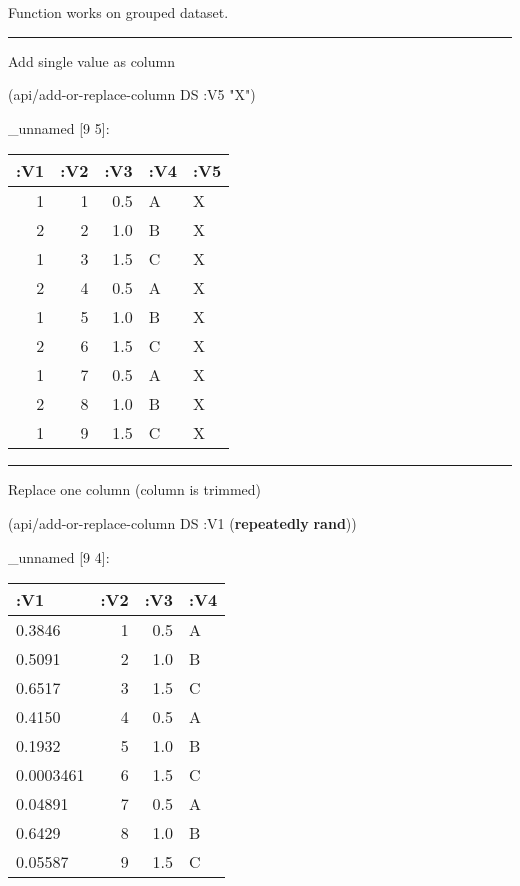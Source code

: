 \documentclass[]{article}
\newenvironment{Shaded}{\begin{snugshade}}{\end{snugshade}}
\newcommand{\KeywordTok}[1]{\textcolor[rgb]{0.13,0.29,0.53}{\textbf{#1}}}
\newcommand{\StringTok}[1]{\textcolor[rgb]{0.31,0.60,0.02}{#1}}
\newcommand{\AttributeTok}[1]{\textcolor[rgb]{0.77,0.63,0.00}{#1}}
\newcommand{\NormalTok}[1]{#1}
\begin{document}
Function works on grouped dataset.

\begin{center}\rule{0.5\linewidth}{0.5pt}\end{center}

Add single value as column

\begin{Shaded}
\begin{Highlighting}[]
\NormalTok{(api/add-or-replace-column DS }\AttributeTok{:V5} \StringTok{"X"}\NormalTok{)}
\end{Highlighting}
\end{Shaded}

\_unnamed {[}9 5{]}:

\begin{longtable}[]{@{}rrrll@{}}
\toprule
:V1 & :V2 & :V3 & :V4 & :V5\tabularnewline
\midrule
\endhead
1 & 1 & 0.5 & A & X\tabularnewline
2 & 2 & 1.0 & B & X\tabularnewline
1 & 3 & 1.5 & C & X\tabularnewline
2 & 4 & 0.5 & A & X\tabularnewline
1 & 5 & 1.0 & B & X\tabularnewline
2 & 6 & 1.5 & C & X\tabularnewline
1 & 7 & 0.5 & A & X\tabularnewline
2 & 8 & 1.0 & B & X\tabularnewline
1 & 9 & 1.5 & C & X\tabularnewline
\bottomrule
\end{longtable}

\begin{center}\rule{0.5\linewidth}{0.5pt}\end{center}

Replace one column (column is trimmed)

\begin{Shaded}
\begin{Highlighting}[]
\NormalTok{(api/add-or-replace-column DS }\AttributeTok{:V1}\NormalTok{ (}\KeywordTok{repeatedly} \KeywordTok{rand}\NormalTok{))}
\end{Highlighting}
\end{Shaded}

\_unnamed {[}9 4{]}:

\begin{longtable}[]{@{}lrrl@{}}
\toprule
:V1 & :V2 & :V3 & :V4\tabularnewline
\midrule
\endhead
0.3846 & 1 & 0.5 & A\tabularnewline
0.5091 & 2 & 1.0 & B\tabularnewline
0.6517 & 3 & 1.5 & C\tabularnewline
0.4150 & 4 & 0.5 & A\tabularnewline
0.1932 & 5 & 1.0 & B\tabularnewline
0.0003461 & 6 & 1.5 & C\tabularnewline
0.04891 & 7 & 0.5 & A\tabularnewline
0.6429 & 8 & 1.0 & B\tabularnewline
0.05587 & 9 & 1.5 & C\tabularnewline
\bottomrule
\end{longtable}
\end{document}
